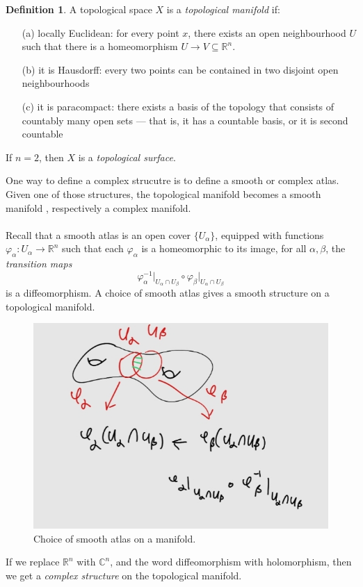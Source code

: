 \documentclass[a4paper]{report}
\theoremstyle{definition}
\newtheorem{definition}{Definition}
\theoremstyle{remark}
\theoremstyle{proposition}
\theoremstyle{conjecture}
\theoremstyle{lemma}
\theoremstyle{corollary}
\theoremstyle{exercise}
\theoremstyle{example}
\newcommand{\C}{\mathbb{C}}
\begin{document}
\begin{definition}
    A topological space $X$ is a \emph{topological manifold} if:
    \begin{itemize}
        \item[(a)] locally Euclidean: for every point $x$, there exists an 
            open neighbourhood $U$ such that there is a homeomorphism 
            $U \to V \subseteq \mathbb{R}^n$.
        \item[(b)] it is Hausdorff: every two points can be contained in two 
            disjoint open neighbourhoods 
        \item[(c)] it is paracompact: there exists a basis of the topology that 
            consists of countably many open sets --- that is, it has a countable
            basis, or it is second countable 
    \end{itemize}
    If $n=2$, then $X$ is a \emph{topological surface}.
\end{definition}

One way to define a complex strucutre is to define a smooth or complex atlas.
Given one of those structures, the topological manifold becomes a smooth manifold
, respectively a complex manifold.\\\\
Recall that a smooth atlas is an open cover $\lbrace U_\alpha\rbrace$,
equipped with functions $\varphi_\alpha:U_\alpha\to\mathbb{R}^n$
such that each $\varphi_\alpha$ is a homeomorphic to its image, 
for all $\alpha,\beta$, the \emph{transition maps} $$\varphi_\alpha^{-1}\vert_{U_\alpha\cap U_\beta} \circ \varphi_\beta\vert_{U_\alpha \cap U_\beta}$$ is a diffeomorphism. 
A choice of smooth atlas gives a smooth structure on a topological manifold.
\begin{figure}[h!]
    \centering
    \includegraphics[scale=0.5]{fig6.jpg}
    \caption{Choice of smooth atlas on a manifold.}
\end{figure}
If we replace $\mathbb{R}^n$ with $\C^n$, and the word diffeomorphism 
with holomorphism, then we get a \emph{complex structure} on the 
topological manifold. 
\end{document}
